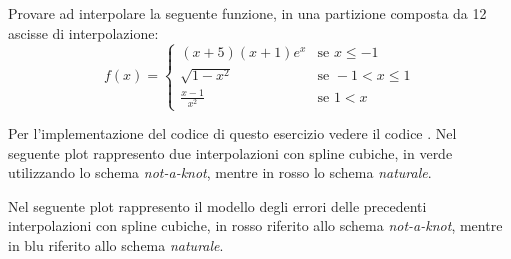 \begin{exercise} 
Provare ad interpolare la seguente funzione, in una partizione composta da 12
ascisse di interpolazione:
\begin{displaymath}
f(x) = \left \lbrace 
\begin{matrix}
	(x+5)(x+1)e^{x} & \text{se } x \leq -1 \\
	\sqrt{1 - x^{2}} & \text{se } -1 < x \leq 1 \\
	\frac{x-1}{x^{2}} & \text{se } 1 < x
\end{matrix} 
\right. 
\end{displaymath}
\end{exercise}
Per l'implementazione del codice di questo esercizio vedere il codice
.
Nel seguente plot rappresento due interpolazioni con spline cubiche, in verde
utilizzando lo schema \emph{not-a-knot}, mentre in rosso lo schema
\emph{naturale}.
\begin{center}   

\end{center}
Nel seguente plot rappresento il modello degli errori delle precedenti
interpolazioni con spline cubiche, in rosso riferito allo
schema \emph{not-a-knot}, mentre in blu riferito allo schema \emph{naturale}.
\begin{center}   

\end{center}

